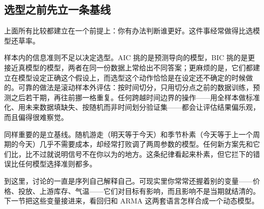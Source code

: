 \subsection{选型之前先立一条基线}

上面所有比较都建立在一个前提上：你有办法判断谁更好。这件事经常做得比选模型还草率。

样本内的信息准则不足以决定选型。AIC 挑的是预测导向的模型，BIC 挑的是更接近真模型的模型，两者在同一份数据上常给出不同答案；更麻烦的是，它们都建立在模型设定正确这个假设上，而选型这个动作恰恰是在设定还不确定的时候做的。可靠的做法是滚动样本外评估：按时间切分，只用切分点之前的数据训练，预测之后若干期，再往前挪一格重复。任何跨越时间边界的操作——用全样本做标准化、用未来数据填缺失、按随机而非时间划分验证集——都会让评估结果偏乐观，而且偏得很难察觉。

同样重要的是立基线。随机游走（明天等于今天）和季节朴素（今天等于上一个周期的今天）几乎不需要成本，却经常打败调了两周参数的模型。任何新方案先和它们比，比不过就说明信号不在你以为的地方。这条纪律看起来朴素，但它拦下的错误比任何模型选择准则都多。

到这里，讨论的一直是序列自己解释自己。可现实里你常常还握着别的变量——价格、投放、上游库存、气温——它们对目标有影响，而且影响不是当期就结清的。下一节把这些变量接进来，看回归和 ARMA 这两套语言怎样合成一个动态模型。
